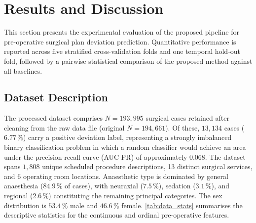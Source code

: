 
\section{Results and Discussion}
\label{sec:results}

This section presents the experimental evaluation of the proposed pipeline for
pre-operative surgical plan deviation prediction.  Quantitative performance is
reported across five stratified cross-validation folds and one temporal
hold-out fold, followed by a pairwise statistical comparison of the proposed
method against all baselines.

\subsection{Dataset Description}
\label{sec:data}

The processed dataset comprises $N = 193{,}995$ surgical cases retained after
cleaning from the raw data file (original $N = 194{,}661$).
Of these, $13{,}134$ cases ($6.77\,\%$) carry a positive deviation label,
representing a strongly imbalanced binary classification problem in which a
random classifier would achieve an area under the precision-recall curve
(AUC-PR) of approximately $0.068$.  The dataset spans $1{,}808$ unique
scheduled procedure descriptions, 13 distinct surgical services, and 6
operating room locations.  Anaesthetic type is dominated by general anaesthesia
($84.9\,\%$ of cases), with neuraxial ($7.5\,\%$), sedation ($3.1\,\%$),
and regional ($2.6\,\%$) constituting the remaining principal categories.  The
sex distribution is $53.4\,\%$ male and $46.6\,\%$ female.
\cref{tab:data_stats} summarises the descriptive statistics for the continuous
and ordinal pre-operative features.

